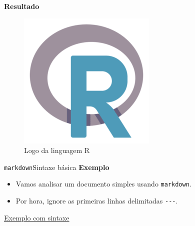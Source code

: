 \documentclass[
  10pt,
  ignorenonframetext,
]{beamer}
\providecommand{\tightlist}{%
  \setlength{\itemsep}{0pt}\setlength{\parskip}{0pt}}\usepackage{longtable,booktabs,array}
\begin{document}
\begin{frame}
\textbf{Resultado}

\begin{figure}

{\centering \includegraphics{figuras/r.png}

}

\caption{Logo da linguagem R}

\end{figure}
\end{frame}

\begin{frame}[fragile]{\texttt{markdown}\newline Sintaxe básica}
\protect\hypertarget{markdownsintaxe-buxe1sica-15}{}
\textbf{Exemplo}

\begin{itemize}
\tightlist
\item
  Vamos analisar um documento simples usando \texttt{markdown}.
\item
  Por hora, ignore as primeiras linhas delimitadas \texttt{-\/-\/-}.
\end{itemize}

\href{https://ufbabr-my.sharepoint.com/:u:/g/personal/gilberto_sassi_ufba_br/EVkS8aZN8rZDqXEJXXVFWzIBfkqMGhKClWZ5Mbmiv6vh4g?e=apQKvV}{Exemplo
com sintaxe}
\end{frame}
\end{document}
